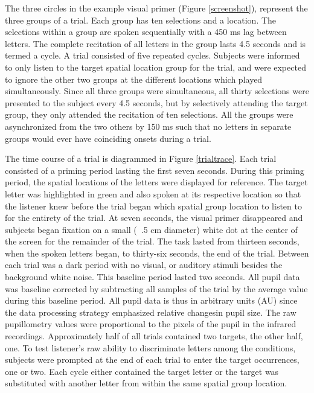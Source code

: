 \documentclass[10pt]{article}
\begin{document}
The three circles in the example visual primer (Figure
\ref{screenshot}), represent the three groups of a trial.
Each group has ten selections and a location.  The selections
within a group are spoken sequentially with a 450 ms lag
between letters.  The complete recitation of all letters in
the group lasts 4.5 seconds and is termed a cycle.  A trial
consisted of five repeated cycles. Subjects were informed to
only listen to the target spatial location group for the
trial, and were expected to ignore the other two groups at the
different locations which played simultaneously. Since all
three groups were simultaneous, all thirty selections were
presented to the subject every 4.5 seconds, but by selectively
attending the target group, they only attended the recitation
of ten selections. All the groups were asynchronized from the
two others by 150 ms such that no letters in separate groups
would ever have coinciding onsets during a trial.

The time course of a trial is diagrammed in Figure
\ref{trialtrace}.  Each trial consisted of a priming period
lasting the first seven seconds.  During this priming period,
the spatial locations of the letters were displayed for
reference.  The target letter was highlighted in green and
also spoken at its respective location so that the listener
knew before the trial began which spatial group location to
listen to for the entirety of the trial. At seven seconds, the
visual primer disappeared and subjects began fixation on a
small (~.5 cm diameter) white dot at the center of the screen
for the remainder of the trial.  The task lasted from thirteen
seconds, when the spoken letters began, to thirty-six seconds,
the end of the trial.  Between each trial was a dark period
with no visual, or auditory stimuli besides the background
white noise. This baseline period lasted two seconds.  All
pupil data was baseline corrected by subtracting all samples
of the trial by the average value during this baseline period.
All pupil data is thus in arbitrary units (AU) since the data
processing strategy emphasized relative changesin pupil size.
The raw pupillometry values were proportional to the pixels of
the pupil in the infrared recordings.  Approximately half of
all trials contained two targets, the other half, one. To test
listener's raw ability to discriminate letters among the
conditions, subjects were prompted at the end of each trial to
enter the target occurrences, one or two. Each cycle either
contained the target letter or the target was substituted with
another letter from within the same spatial group location.
\end{document}
